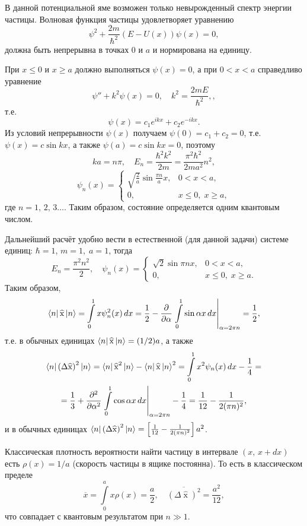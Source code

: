 \documentclass[a4paper]{article}
\begin{document}
\begin{sol}
В данной потенциальной яме возможен только невырожденный спектр
энергии частицы. Волновая функция частицы удовлетворяет
уравнению
\[
	\psi^2+ \frac{2m}{\hbar^2}(E-U(x))\psi(x)=0
 ,\] 
должна быть непрерывна в точках 0 и $a$ и нормирована на единицу.

При $x \le 0$ и $x \ge a$ должно выполняться $\psi(x)=0$, а при
$0<x<a$ справедливо уравнение
\[
	\psi''+k^2 \psi(x)=0, \quad k^2 = \frac{2mE}{\hbar^2},
 ,\] 
т.\:е.
\[
	\psi(x)= c_1 e^{ikx}+ c_2 e^{-ikx}
.\] 
Из условий непрерывности $\psi(x)$ получаем $\psi(0)=c_1+c_2=0$,
т.\:е. $\psi(x)=c \sin kx$, а также $\psi(a)= c \sin kx=0$,
поэтому
\[
ka= n \pi,\quad E_n = \frac{\hbar^2 k^2}{2m}= \frac{\pi^2
\hbar^2}{2 m a^2}n^2,
\]
\[
	\psi_n(x)= \begin{cases}
		\sqrt{\frac{2}{a}} \sin \frac{\pi n}{a} x, &
		0<x<a,\\
		0,& x\le 0,\;x\ge a,
	\end{cases}
\]
где $n= 1,\,2,\,3\ldots$. Таким образом, состояние определяется
одним квантовым числом.

Дальнейший расчёт удобно вести в естественной (для данной задачи)
системе единиц: $\hbar=1$, $m=1,\;a=1$, тогда
\[
	E_n= \frac{\pi^2 n^2}{2},\quad \psi_n (x)=
	\begin{cases}
		\sqrt{2} \sin \pi n x,& 0<x<a,\\
		0,& x\le 0,\; x\ge a.
	\end{cases}
\]
Таким образом,
\[
	\bra{n}\widehat{\operatorname{x}}\ket{n}=  \int\limits_{0}^{1} 
	x \psi_n^2(x)\,dx=\frac{1}{2}- \frac{\partial }{\partial \alpha} \left. \int\limits_{0}^{1} \sin \alpha x\, dx \right|_{\alpha=
		2\pi n}=\frac{1}{2}, 
\] 
т.\:е. в обычных единицах $\bra{n} \widehat{\operatorname{x}}\ket{n}=
(1 /2) a$, а также
\begin{multline*}
	\bra{n}\left( \Delta \widehat{\operatorname{x}} \right) ^2
	\ket{n}= \bra{n} \widehat{\operatorname{x}}^2 \ket{n}-
	\bra{n}\widehat{\operatorname{x}}\ket{n}^2=
	\int\limits_{0}^{1} x^2 \psi_n(x)\, dx-\frac{1}{4}= \\=
	\frac{1}{3}+ \frac{\partial ^2}{\partial \alpha^2}\left. 
		\int\limits_{0}^{1} \cos \alpha x \,
		dx\right|_{\alpha=2\pi n}-\frac{1}{4}=\frac{1}{12}
		-\frac{1}{2 (\pi n)^2},
\end{multline*} 
и в обычных единицах $\bra{n} \left( \Delta \widehat{\operatorname{x}} \right) ^2 \ket{n}= \left[ \frac{1}{12}- \frac{1}{2 (\pi n)^2} \right]a^2 $.

Классическая плотность вероятности найти частицу в интервале
$(x,\,x+dx)$ есть $\rho(x)= 1 /a$ (скорость частицы в ящике
постоянна). То есть в классическом пределе
 \[
	 \overline{x}= \int\limits_{0}^{a} x \rho(x) =\frac{a}{2},\quad
	 \overline{\left( \Delta \widehat{\operatorname{x}} \right) ^2}=\frac{a^2}{12},
\]
что совпадает с квантовым результатом при $n \gg 1$.


\end{sol}
\end{document}
